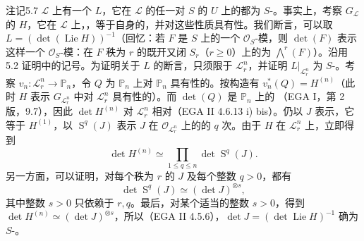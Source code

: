 \begin{SGAresult}{注记}{5.7}
$\mathscr L$ 上有一个 $L$，它在 $\mathscr L$ 的任一对 $S$ 的 $U$ 上的都为 $S$-。事实上，考察 $G_{\mathscr L}$ 的 $H$，它在 $\mathscr L$ 上，，等于自身的，并对这些性质具有性。我们断言，可以取 $L=(\det(\operatorname{Lie}H))^{-1}$（回忆：若 $F$ 是 $S$ 上的一个 $\mathcal O_S$-模，则 $\det(F)$ 表示这样一个 $\mathcal O_S$-模：在 $F$ 秩为 $r$ 的既开又闭 $S_r$（$r\geq0$）上的为 $\bigwedge^r(F)$）。沿用 5.2 证明中的记号。为证明关于 $L$ 的断言，只须限于 $\mathscr L_r^n$，并证明 $L|_{\mathscr L_r^n}$ 为 $S$-。考察 $v_n:\mathscr L_r^n\to\mathbb P_n$，令 $Q$ 为 $\mathbb P_n$ 上对 $\mathbb P_n$ 具有性的。按构造有 $v_n^*(Q)=H^{(n)}$（此时 $H$ 表示 $G_{\mathscr L_r^n}$ 中对 $\mathscr L_r^n$ 具有性的）。而 $\det(Q)$ 是 $\mathbb P_n$ 上的
（EGA I，第 2 版，9.7），因此 $\det H^{(n)}$ 对 $\mathscr L_r^n$ 相对（EGA II 4.6.13 i) bis）。仍以 $J$ 表示，它等于 $H^{(1)}$，以 $\operatorname S^q(J)$ 表示 $J$ 在 $\mathcal O_{\mathscr L_r^n}$ 上的的 $q$ 次。由于 $H$ 在 $\mathscr L_r^n$ 上，立即得到
\[\det H^{(n)}\simeq\prod_{1\leq q\leq n}\det\operatorname S^q(J).\]
另一方面，可以证明，对每个秩为 $r$ 的 $J$ 及每个整数 $q>0$，都有
\[\det\operatorname S^q(J)\simeq(\det J)^{\otimes s},\]
其中整数 $s>0$ 只依赖于 $r,q$。最后，对某个适当的整数 $s>0$，得到 $\det H^{(n)}\simeq(\det J)^{\otimes s}$，所以（EGA II 4.5.6），$\det J=(\det\operatorname{Lie}H)^{-1}$ 确为 $S$-。
\end{SGAresult}
